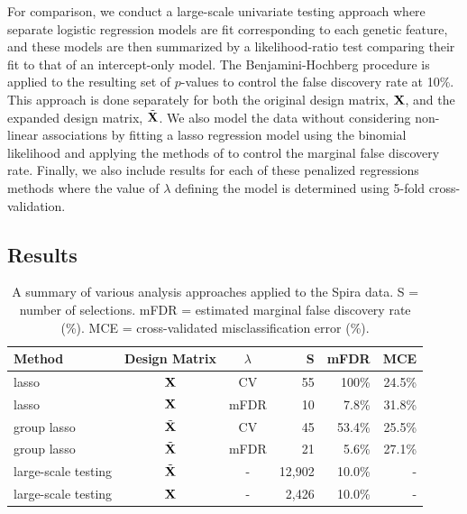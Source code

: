 For comparison, we conduct a large-scale univariate testing approach where separate logistic regression models are fit corresponding to each genetic feature, and these models are then summarized by a likelihood-ratio test comparing their fit to that of an intercept-only model. The Benjamini-Hochberg procedure is applied to the resulting set of $p$-values to control the false discovery rate at 10\%. This approach is done separately for both the original design matrix, $\mathbf{X}$, and the expanded design matrix, $\tilde{\mathbf{X}}$. We also model the data without considering non-linear associations by fitting a lasso regression model using the binomial likelihood and applying the methods of \citet{Miller2019} to control the marginal false discovery rate. Finally, we also include results for each of these penalized regressions methods where the value of $\lambda$ defining the model is determined using 5-fold cross-validation.

\subsection{Results}

\begin{table}[htb!]
\centering
\caption{\label{Tab:case-studies} A summary of various analysis approaches applied to the Spira data. S = number of selections. mFDR = estimated marginal false discovery rate (\%). MCE = cross-validated misclassification error (\%).}
\vspace{.2cm}
\begin{tabular}{l c c r r r}
\hline
Method & Design Matrix & $\lambda$ & S & mFDR & MCE \\
\hline
lasso & $\mathbf{X}$ & CV & 55 & 100\% & 24.5\% \\
lasso & $\mathbf{X}$ & mFDR & 10 & 7.8\% & 31.8\% \\
group lasso & $\tilde{\mathbf{X}}$ & CV & 45 & 53.4\% & 25.5\% \\
group lasso & $\tilde{\mathbf{X}}$ & mFDR & 21 & 5.6\% & 27.1\% \\
large-scale testing & $\tilde{\mathbf{X}}$ & - & 12,902 & 10.0\% & - \\
large-scale testing & $\mathbf{X}$ & - & 2,426 & 10.0\% & - \\
\hline
\end{tabular}
\end{table}

